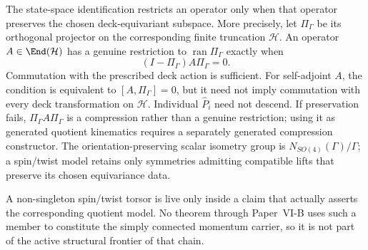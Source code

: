 \documentclass[11pt,a4paper]{article}
\begin{document}
\begin{proposition}
The state-space identification restricts an operator only when that operator
preserves the chosen deck-equivariant subspace.  More precisely, let
\(\Pi_\Gamma\) be its orthogonal projector on the corresponding finite
truncation \(\mathcal H\).  An operator \(A\in\End(\mathcal H)\) has a
genuine restriction to \(\operatorname{ran}\Pi_\Gamma\) exactly when
\[
 (I-\Pi_\Gamma)A\Pi_\Gamma=0.
\]
Commutation with the prescribed deck action is sufficient.  For self-adjoint
\(A\), the condition is equivalent to \([A,\Pi_\Gamma]=0\), but it need
not imply commutation with every deck transformation on \(\mathcal H\).
Individual \(\hat P_i\) need not descend.  If preservation fails,
\(\Pi_\Gamma A\Pi_\Gamma\) is a compression rather than a genuine
restriction; using it as generated quotient kinematics requires a separately
generated compression constructor.  The orientation-preserving scalar
isometry group is \(N_{SO(4)}(\Gamma)/\Gamma\); a spin/twist model retains
only symmetries admitting compatible lifts that preserve its chosen
equivariance data.
\end{proposition}
\begin{remark}
A non-singleton spin/twist torsor is live only inside a claim that actually
asserts the corresponding quotient model.  No theorem through Paper~VI-B uses
such a member to constitute the simply connected momentum carrier, so it is
not part of the active structural frontier of that chain.
\end{remark}
\end{document}
